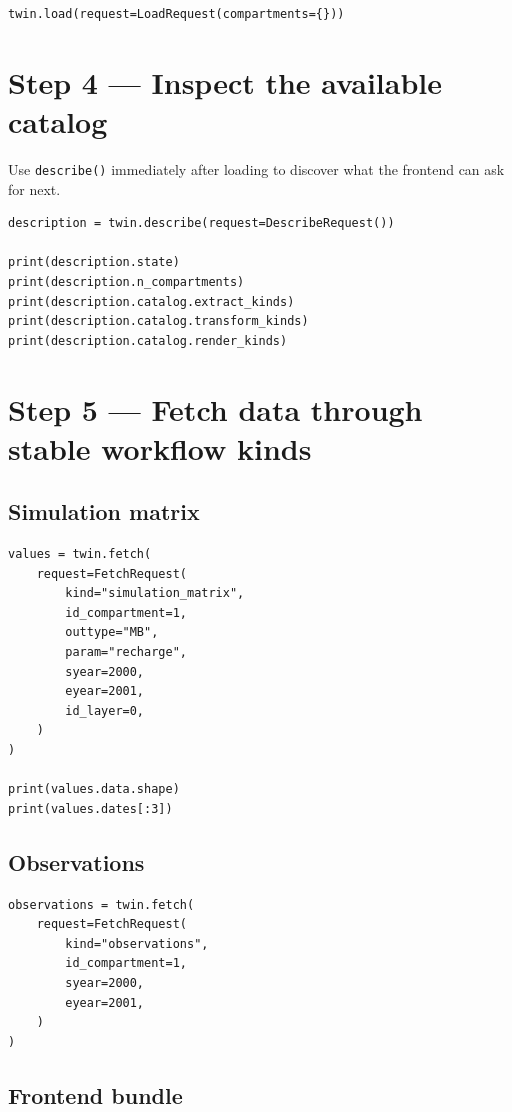 \documentclass[11pt]{article}
\begin{document}
\begin{verbatim}
twin.load(request=LoadRequest(compartments={}))
\end{verbatim}

\section{Step 4 --- Inspect the available catalog}

Use \texttt{describe()} immediately after loading to discover what the frontend
can ask for next.

\begin{verbatim}
description = twin.describe(request=DescribeRequest())

print(description.state)
print(description.n_compartments)
print(description.catalog.extract_kinds)
print(description.catalog.transform_kinds)
print(description.catalog.render_kinds)
\end{verbatim}

\section{Step 5 --- Fetch data through stable workflow kinds}

\subsection*{Simulation matrix}

\begin{verbatim}
values = twin.fetch(
    request=FetchRequest(
        kind="simulation_matrix",
        id_compartment=1,
        outtype="MB",
        param="recharge",
        syear=2000,
        eyear=2001,
        id_layer=0,
    )
)

print(values.data.shape)
print(values.dates[:3])
\end{verbatim}

\subsection*{Observations}

\begin{verbatim}
observations = twin.fetch(
    request=FetchRequest(
        kind="observations",
        id_compartment=1,
        syear=2000,
        eyear=2001,
    )
)
\end{verbatim}

\subsection*{Frontend bundle}
\end{document}
